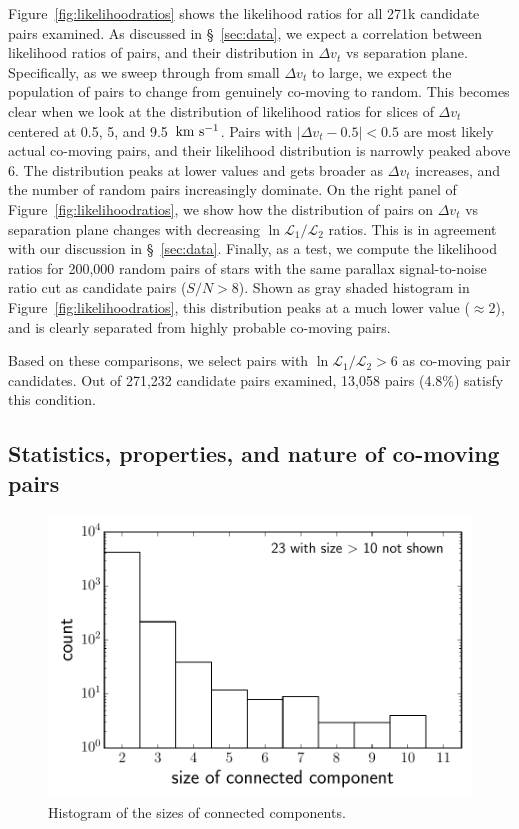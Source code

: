 \documentclass[manuscript, letterpaper]{aastex6}
\newcommand{\kms}{\ensuremath{\rm km~s^{-1}}}
\begin{document}
Figure~\ref{fig:likelihoodratios} shows the likelihood ratios for all
271k candidate pairs examined.
As discussed in \S~\ref{sec:data}, we expect a correlation between likelihood
ratios of pairs, and their distribution in $\Delta v_t$ vs separation plane.
Specifically, as we sweep through from small $\Delta v_t$ to large, we expect
the population of pairs to change from genuinely co-moving to random.
This becomes clear when we look at the distribution of likelihood ratios for
slices of $\Delta v_t$ centered at 0.5, 5, and 9.5~\kms.
Pairs with $|\Delta v_t-0.5|<0.5$ are most likely actual co-moving pairs, and
their likelihood distribution is narrowly peaked above 6.
The distribution peaks at lower values and gets broader as $\Delta v_t$ increases,
and the number of random pairs increasingly dominate.
On the right panel of Figure~\ref{fig:likelihoodratios}, we show
how the distribution of pairs on $\Delta v_t$ vs separation plane changes
with decreasing $\ln \mathcal{L}_1 /\mathcal{L}_2$ ratios.
This is in agreement with our discussion in \S~\ref{sec:data}.
Finally, as a test,
we compute the likelihood ratios for 200,000 random pairs of stars with the same
parallax signal-to-noise ratio cut as candidate pairs ($S/N > 8$).
Shown as gray shaded histogram in Figure~\ref{fig:likelihoodratios},
this distribution peaks at a much lower value ($\approx 2$),
and is clearly separated from highly probable co-moving pairs.

Based on these comparisons, we select pairs with
$\ln \mathcal{L}_1 /\mathcal{L}_2 > 6$ as co-moving pair candidates.
Out of 271,232 candidate pairs examined, 13,058 pairs (4.8\%)
satisfy this condition.

\subsection{Statistics, properties, and nature of co-moving pairs}

\begin{figure}[htbp]
  \begin{center}
    \includegraphics[width=\textwidth]{figures/dist_networksize.pdf}
  \end{center}
  \caption{%
    Histogram of the sizes of connected components.
    \label{fig:hist_ccsize}}
\end{figure}
\end{document}
